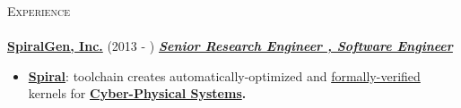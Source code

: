\documentclass{article}
\newcommand{\lineunder}{\vspace*{-8pt} \\ \hspace*{-18pt} \hrulefill \\}
\newcommand{\header}[1]{{\hspace*{-15pt}\vspace*{6pt} \textsc{#1}} \vspace*{-6pt} \lineunder}
\newcommand{\employer}[3]{{ \textbf{#1} (#2) \underline{\textbf{\emph{#3}}}\\  }}
\begin{document}
\header{Experience}

\employer{\href{http://spiralgen.com/}{SpiralGen, Inc.}}{2013 - }{Senior Research Engineer , Software Engineer}


\vspace{1mm}

    \begin{itemize}
      \item \textbf{\href{http://spiral.net/}{Spiral}}: toolchain creates automatically-optimized  and \href{https://en.wikipedia.org/wiki/Formal_methods}{formally-verified} kernels for \textbf{\href{https://en.wikipedia.org/wiki/Cyber-physical_system}{Cyber-Physical Systems}.} 


\end{itemize}
\end{document}
